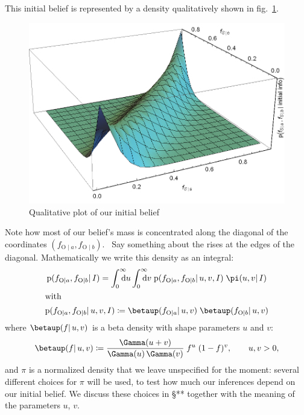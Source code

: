 \documentclass[\ifafour a4paper,12pt,\else a5paper,10pt,\fi%
onecolumn,oneside,article,%
british%
]{memoir}
\theoremstyle{remark}
\theoremstyle{innote}
\newcommand*{\di}{\mathrm{d}}%
\newcommand*{\defd}{\coloneqq}
\newcommand*{\pf}{\mathrm{p}}%
\renewcommand*{\|}{\mathpunct{|}}
\newcommand*{\sect}{\S}%
\newcommand*{\fig}{fig.}%
\newcommand*{\puzzle}{\maltese}
\newcommand{\mynote}[1]{ {\color{notecolour}\puzzle\ #1}}
\newcommand*{\yI}{I}
\newcommand*{\ya}{a}
\newcommand*{\yb}{b}
\newcommand*{\ysA}{\textrm{O}}%
\newcommand*{\dbeta}{\betaup}
\newcommand*{\dA}{\pi}
\newcommand*{\yua}{u}
\newcommand*{\yub}{v}
\begin{document}
This initial belief is represented by a density qualitatively shown in
\fig~\ref{fig:initial_belief}.
\begin{figure}[b!]%
 \centering\includegraphics[width=0.95\linewidth]{prior3d.png}
\caption{Qualitative plot of our initial belief}\label{fig:initial_belief}
\end{figure}%
Note how most of our belief's mass is concentrated along the diagonal of
the coordinates $(f_{\ysA\|\ya}, f_{\ysA\|\yb})$. \mynote{Say something
  about the rises at the edges of the diagonal.} Mathematically we write
this density as an integral:
\begin{gather}
  \label{eq:beta_gamma_prior}
  \pf(f_{\ysA\|\ya}, f_{\ysA\|\yb} \| \yI)
  =
  \int_{\mathrlap{0}}^{\mathrlap{\infty}}\di\yua
  \int_{\mathrlap{0}}^{\mathrlap{\infty}}\di\yub\;
\pf(f_{\ysA\|\ya}, f_{\ysA\|\yb} \| \yua,\yub,\yI)\;
  \dA(\yua,\yub \| \yI)
  \\
\shortintertext{with}
  \label{eq:def_ff_given_Aq}
\pf(f_{\ysA\|\ya}, f_{\ysA\|\yb} \| \yua,\yub,\yI)\defd
  \dbeta(f_{\ysA\|\ya} \| \yua,\yub)\;
  \dbeta(f_{\ysA\|\yb} \| \yua,\yub)
\end{gather}
where $\dbeta(f \| \yua,\yub)$ is a beta density with shape
parameters $\yua$ and $\yub$:
\begin{equation}
  \label{eq:def_beta}
  \dbeta(f \| \yua,\yub) \defd
  \frac{\Gamma(\yua+\yub)}{\Gamma(\yua)\,\Gamma(\yub)}\;
  f^{\yua}\;(1-f)^{\yub},
  \qquad  \yua,\yub>0,
\end{equation}
and $\dA$ is a normalized density that we leave unspecified for the moment: several
different choices for $\dA$ will be used, to test how much our inferences
depend on our initial belief. We discuss these choices in \sect*** together
with the meaning of the parameters $\yua$, $\yub$.
\end{document}
